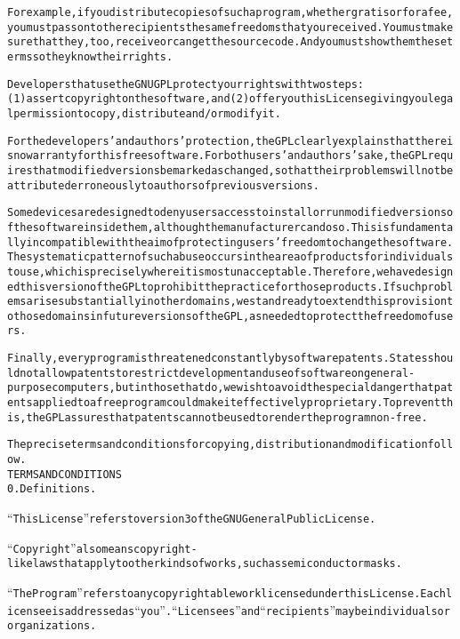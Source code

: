 \begin{alltt}
For example, if you distribute copies of such a program, whether gratis or for a fee, you must pass on to the recipients the same freedoms that you received. You must make sure that they, too, receive or can get the source code. And you must show them these terms so they know their rights.

Developers that use the GNU GPL protect your rights with two steps: (1) assert copyright on the software, and (2) offer you this License giving you legal permission to copy, distribute and/or modify it.

For the developers' and authors' protection, the GPL clearly explains that there is no warranty for this free software. For both users' and authors' sake, the GPL requires that modified versions be marked as changed, so that their problems will not be attributed erroneously to authors of previous versions.

Some devices are designed to deny users access to install or run modified versions of the software inside them, although the manufacturer can do so. This is fundamentally incompatible with the aim of protecting users' freedom to change the software. The systematic pattern of such abuse occurs in the area of products for individuals to use, which is precisely where it is most unacceptable. Therefore, we have designed this version of the GPL to prohibit the practice for those products. If such problems arise substantially in other domains, we stand ready to extend this provision to those domains in future versions of the GPL, as needed to protect the freedom of users.

Finally, every program is threatened constantly by software patents. States should not allow patents to restrict development and use of software on general-purpose computers, but in those that do, we wish to avoid the special danger that patents applied to a free program could make it effectively proprietary. To prevent this, the GPL assures that patents cannot be used to render the program non-free.

The precise terms and conditions for copying, distribution and modification follow.
TERMS AND CONDITIONS
0. Definitions.

“This License” refers to version 3 of the GNU General Public License.

“Copyright” also means copyright-like laws that apply to other kinds of works, such as semiconductor masks.

“The Program” refers to any copyrightable work licensed under this License. Each licensee is addressed as “you”. “Licensees” and “recipients” may be individuals or organizations.


\end{alltt}
